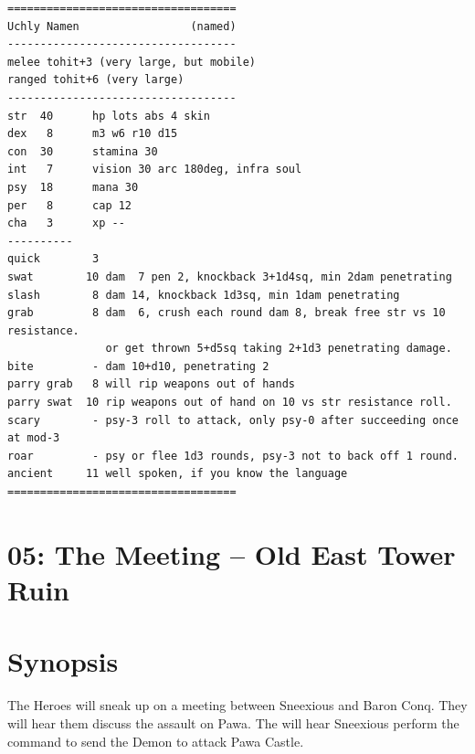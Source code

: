 \documentclass[11pt, twoside, titlepage, a4paper]{report}
\renewcommand{\chaptermark}[1]{\markboth{#1}{}}
\begin{document}
\goodbreak
\small \begin{verbatim}
===================================
Uchly Namen                 (named)
-----------------------------------
melee tohit+3 (very large, but mobile)
ranged tohit+6 (very large)
-----------------------------------
str  40      hp lots abs 4 skin
dex   8      m3 w6 r10 d15
con  30      stamina 30
int   7      vision 30 arc 180deg, infra soul
psy  18      mana 30
per   8      cap 12
cha   3      xp --
----------
quick        3
swat        10 dam  7 pen 2, knockback 3+1d4sq, min 2dam penetrating
slash        8 dam 14, knockback 1d3sq, min 1dam penetrating
grab         8 dam  6, crush each round dam 8, break free str vs 10 resistance.
               or get thrown 5+d5sq taking 2+1d3 penetrating damage.
bite         - dam 10+d10, penetrating 2
parry grab   8 will rip weapons out of hands
parry swat  10 rip weapons out of hand on 10 vs str resistance roll.
scary        - psy-3 roll to attack, only psy-0 after succeeding once at mod-3
roar         - psy or flee 1d3 rounds, psy-3 not to back off 1 round.
ancient     11 well spoken, if you know the language
===================================

\end{verbatim}
\normalsize




















\clearpage
{}
\section*{05: The Meeting -- Old East Tower Ruin}
\chaptermark{villains' meeting}


\section*{Synopsis}
The Heroes will sneak up on a meeting between Sneexious and Baron Conq. They will hear them discuss the assault on Pawa. The will hear Sneexious perform the command to send the Demon to attack Pawa Castle.
\end{document}
